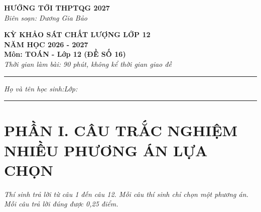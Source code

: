 \documentclass[12pt,a4paper]{article}
\begin{document}
\thispagestyle{empty}

\noindent
\begin{minipage}[t]{0.42\textwidth}
    \centering
    \textbf{HƯỚNG TỚI THPTQG 2027}\\[2pt]
    \textit{Biên soạn: Dương Gia Bảo}\\[5pt]
    \setlength{\fboxrule}{0.8pt}%
    \setlength{\fboxsep}{4pt}%
\end{minipage}\hfill
\begin{minipage}[t]{0.56\textwidth}
    \centering
    \textbf{KỲ KHẢO SÁT CHẤT LƯỢNG LỚP 12}\\[2pt]
    \textbf{NĂM HỌC 2026 - 2027}\\[2pt]
    \textbf{Môn: TOÁN - Lớp 12 (ĐỀ SỐ 16)}\\[2pt]
    \textit{\small Thời gian làm bài: 90 phút, không kể thời gian giao đề}\\[5pt]
    \setlength{\fboxrule}{0.8pt}%
    \setlength{\fboxsep}{4pt}%
\end{minipage}

\vspace{5pt}
\noindent\rule{\linewidth}{0.6pt}
\vspace{2pt}

\noindent\textit{Họ và tên học sinh:}\dotfill \textit{Lớp:}\makebox[3.5cm]{\dotfill}

\vspace{-2pt}
\noindent\rule{\linewidth}{0.6pt}
\vspace{4pt}

\section*{\large PHẦN I. CÂU TRẮC NGHIỆM NHIỀU PHƯƠNG ÁN LỰA CHỌN}
\textit{Thí sinh trả lời từ câu 1 đến câu 12. Mỗi câu thí sinh chỉ chọn một phương án. Mỗi câu trả lời đúng được 0,25 điểm.}
\end{document}
